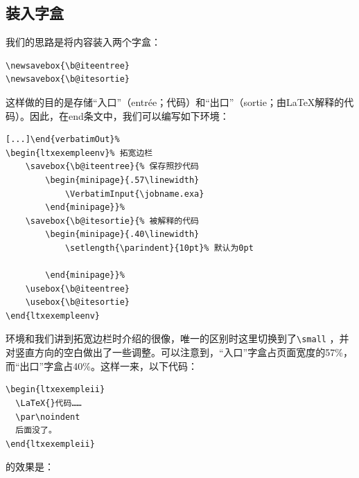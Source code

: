 \subsection{装入字盒}

我们的思路是将内容装入两个字盒：

\begin{dmd}
\begin{verbatim}
\newsavebox{\b@iteentree}
\newsavebox{\b@itesortie}\end{verbatim}
\end{dmd}

这样做的目的是存储“入口”（entrée；代码）和“出口”（sortie；由\LaTeX 解释的代码）。因此，在end条文中，我们可以编写如下环境：

\begin{dmd}
\begin{verbatim}
[...]\end{verbatimOut}%
\begin{ltxexempleenv}% 拓宽边栏
    \savebox{\b@iteentree}{% 保存照抄代码
        \begin{minipage}{.57\linewidth}
            \VerbatimInput{\jobname.exa}
        \end{minipage}}%
    \savebox{\b@itesortie}{% 被解释的代码
        \begin{minipage}{.40\linewidth} 
            \setlength{\parindent}{10pt}% 默认为0pt
            
        \end{minipage}}%
    \usebox{\b@iteentree}
    \usebox{\b@itesortie}
\end{ltxexempleenv}\end{verbatim}
\end{dmd}

环境和我们讲到拓宽边栏时介绍的很像，唯一的区别时这里切换到了\verb|\small|%
，并对竖直方向的空白做出了一些调整。可以注意到，“入口”字盒占页面宽度的57\%，而“出口”字盒占40\%。这样一来，以下代码：

\begin{dmd}
\begin{verbatim}
\begin{ltxexempleii}
  \LaTeX{}代码……
  \par\noindent
  后面没了。
\end{ltxexempleii}\end{verbatim}
\end{dmd}

的效果是：

\makeatletter%



